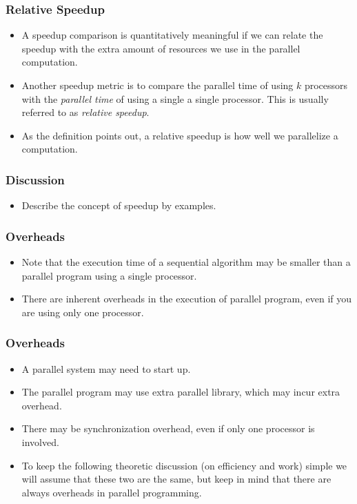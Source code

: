 \documentclass{beamer}
\begin{document}
\begin{CJK}{UTF8}{bsmi}
\begin{frame}
\frametitle{Relative Speedup}
\begin{itemize}
\item A speedup comparison is quantitatively meaningful if we can relate
  the speedup with the extra amount of resources we use in the
  parallel computation.
\item Another speedup metric is to compare the parallel time of using
  $k$ processors with the {\em parallel time} of using a single a
  single processor.  This is usually referred to as {\em relative
    speedup}.
\item As the definition points out, a relative speedup is how well we
  parallelize a computation.
\end{itemize}
\end{frame}


\begin{frame}
\frametitle{Discussion}
\begin{itemize}
\item Describe the concept of speedup by examples.
\end{itemize}
\end{frame}

\begin{frame}
\frametitle{Overheads}
\begin{itemize}
\item Note that the execution time of a sequential algorithm may be
  smaller than a parallel program using a single processor.
\item There are inherent overheads in the execution of parallel
  program, even if you are using only one processor.
\end{itemize}
\end{frame}

\begin{frame}
\frametitle{Overheads}
\begin{itemize}
\item A parallel system may need to start up.
\item The parallel program may use extra parallel library, which may
  incur extra overhead.
\item There may be synchronization overhead, even if only one
  processor is involved.
\item To keep the following theoretic discussion (on efficiency and
  work) simple we will assume that these two are the same, but keep in
  mind that there are always overheads in parallel programming.
\end{itemize}
\end{frame}



\end{CJK}
\end{document}
